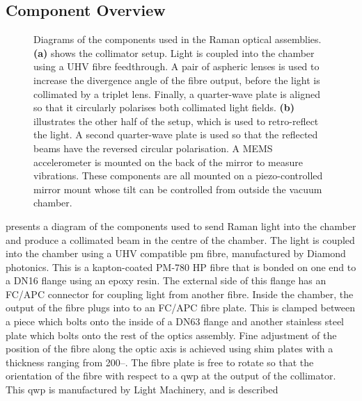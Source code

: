 \subsection{Component Overview}\label{subsec:setup_ramancollimator}
\begin{figure}[!htbp]
	\centering
	\def\svgwidth{\columnwidth}
  \fontsize{16pt}{16pt}
	\subfloat[][]{\scalebox{0.4}{\label{fig:raman_collimator}}}
	\subfloat[][]{\scalebox{0.4}{\label{fig:mirror_mount}}}
	\caption[Drawings of the componets used in the Raman optics
		assemblies]{Diagrams of the components used in the Raman optical assemblies.
      \textbf{(a)} shows the collimator setup. Light is coupled into the chamber using a
		UHV fibre feedthrough. A pair of aspheric lenses is used to increase the
		divergence angle of the fibre output, before the light is collimated by a
		triplet lens. Finally, a quarter-wave plate is aligned so that it circularly
    polarises both collimated light fields. \textbf{(b)} illustrates the other half of the
		setup, which is used to retro-reflect the light. A second quarter-wave plate
		is used so that the reflected beams have the reversed circular
    polarisation. A MEMS accelerometer is mounted on the back of the
		mirror to measure vibrations. These components are all mounted on a
		piezo-controlled mirror mount whose tilt can be controlled from outside the
		vacuum chamber.}
	\label{fig:raman_optics}
\end{figure}
 presents a diagram of the components used to
send Raman light into the chamber and produce a collimated beam in the centre of
the chamber. The light is coupled into the chamber using a UHV compatible
\ac{pm} fibre, manufactured by Diamond photonics. This is a kapton-coated PM-780
HP fibre that is bonded on one end to a DN16 flange using an epoxy resin. The
external side of this flange has an FC/APC connector for coupling light from
another fibre. Inside the chamber, the output of the fibre plugs into to an FC/APC fibre
plate. This is clamped between a piece which bolts onto the inside of a DN63
flange and another stainless steel plate which bolts onto the rest of the optics
assembly. Fine adjustment of the position of the fibre along the optic axis is
achieved using shim plates with a thickness ranging from
200--. The fibre plate is free to rotate so that the
orientation of the fibre with respect to a \ac{qwp} at the output of the
collimator. This \ac{qwp} is manufactured by Light Machinery, and is described
